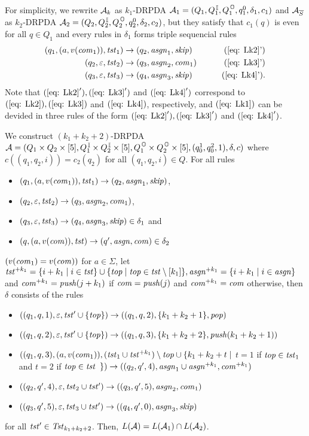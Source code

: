 For simplicity, we rewrite ${\cal A}_k$ as $k_1$-DRPDA ${\cal A}_1=(Q_1, Q^{\, \mathbb{I}}_1, Q^{\, \mathbb{O}}_1, q^0_1, \delta_1, c_1)$ and ${\cal A}_{\overline{S}}$ as $k_2$-DRPDA ${\cal A}_2=(Q_2, Q^{\, \mathbb{I}}_2, Q^{\, \mathbb{O}}_2, q^0_2, \delta_2, c_2)$, but they satisfy that $c_1(q)$ is even for all $q\in Q_1$ and
every rules in $\delta_1$ forms triple sequencial rules
\begin{align}
(q_1, (a,v(\com_1)), \tst_1) &\to (q_2,\asgn_1, \skip)& \tag{\ref{eq: Lk2}'}\\
(q_2, \varepsilon, \tst_2) &\to (q_3,\asgn_2, \com_1)& \tag{\ref{eq: Lk3}'}\\
(q_3, \varepsilon, \tst_3) &\to (q_4,\asgn_3, \skip)& \tag{\ref{eq: Lk4}'}.
\end{align}
Note that $(\ref{eq: Lk2}'), (\ref{eq: Lk3}')$ and $(\ref{eq: Lk4}')$ correspond to $(\ref{eq: Lk2}), (\ref{eq: Lk3})$ and $(\ref{eq: Lk4})$, respectively, and $(\ref{eq: Lk1})$ can be devided in three rules of the form $(\ref{eq: Lk2}'), (\ref{eq: Lk3}')$ and $(\ref{eq: Lk4}')$.

We construct $(k_1+k_2+2)$-DRPDA
${\cal A}=(Q_1\times Q_2\times[5], Q^{\, \mathbb{I}}_1\times Q^{\, \mathbb{I}}_2\times[5], Q^{\, \mathbb{O}}_1\times Q^{\, \mathbb{O}}_2\times[5], (q^1_0, q^2_0, 1), \delta, c)$
where $c((q_1,q_2,i))=c_2(q_2)$ for all $(q_1,q_2,i)\in Q$.
For all rules
\begin{itemize}
\item $(q_1, (a,v(\mathit{com}_1)), \mathit{tst}_1)\to(q_2,\mathit{asgn}_1, \mathit{skip})$,
\item $(q_2, \varepsilon, \mathit{tst}_2)\to(q_3,\mathit{asgn}_2, \mathit{com}_1)$,
\item $(q_3, \varepsilon, \mathit{tst}_3)\to(q_4,\mathit{asgn}_3, \mathit{skip})\in\delta_1$ and
\item $(q, (a,v(\mathit{com})), \mathit{tst})\to(q',\mathit{asgn}, \mathit{com})\in\delta_2$
\end{itemize}
$(v(\mathit{com}_1)=v(\mathit{com}))$ for $a\in\Sigma$,
let $\mathit{tst}^{+ k_1}=\{i+k_1\mid i\in\mathit{tst}\}\cup\{\mathit{top}\mid\mathit{top}\in\mathit{tst}\setminus[k_1]\}, \mathit{asgn}^{+ k_1}=\{i+k_1\mid i\in\mathit{asgn}\}$ and $\mathit{com}^{+ k_1} = \mathit{push}(j+k_1)$ if $\mathit{com}=\mathit{push}(j)$ and $\mathit{com}^{+ k_1} = \mathit{com}$ otherwise, then $\delta$ consists of the rules
\begin{itemize}
\item $((q_1, q, 1), \varepsilon, \mathit{tst}'\cup\{\mathit{top}\})\to((q_1, q, 2), \{k_1+k_2+1\}, \mathit{pop})$
\item $((q_1, q, 2), \varepsilon, \mathit{tst}'\cup\{\mathit{top}\})\to((q_1, q, 3), \{k_1+k_2+2\}, \mathit{push}(k_1+k_2+1))$
\item $((q_1, q, 3), (a,v(\mathit{com}_1)), (\mathit{tst}_1\cup\mathit{tst}^{+ k_1})\setminus\mathit{top}\cup\{k_1+k_2+t\mid$ $t=1$ if $\mathit{top}\in\mathit{tst}_1$ and $t=2$ if $\mathit{top}\in\mathit{tst}$ $\})\to((q_2, q', 4), \mathit{asgn}_1\cup\mathit{asgn}^{+ k_1}, \mathit{com}^{+ k_1})$
\item $((q_2, q', 4), \varepsilon, \mathit{tst}_2\cup\mathit{tst}')\to((q_3, q', 5), \mathit{asgn}_2, \mathit{com}_1)$
\item $((q_3, q', 5), \varepsilon, \mathit{tst}_3\cup\mathit{tst}')\to((q_4, q', 0), \mathit{asgn}_3, \mathit{skip})$
\end{itemize}
for all $\mathit{tst}'\in\mathit{Tst}_{k_1+k_2+2}$.
Then, $L({\cal A})=L({\cal A}_1)\cap L({\cal A}_2)$.

